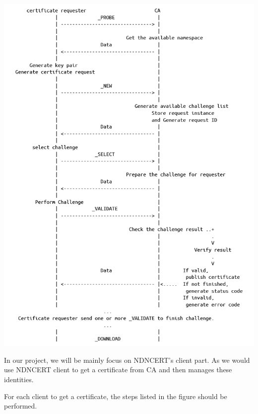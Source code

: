 \documentclass[a0,portrait]{poster}
\begin{document}
\begin{multicols}{2}
\begin{minipage}[b]{0.55\linewidth}
\end{minipage}
\begin{minipage}[b]{0.45\linewidth}
	\includegraphics[width=\linewidth]{figures/protocol.png}
\end{minipage}
\par
	In our project, we will be mainly focus on NDNCERT's client part. 
	As we would use NDNCERT client to get a certificate from CA and then manages these identities.
\par
	For each client to get a certificate, the steps listed in the figure should be performed.


\end{multicols}
\end{document}
